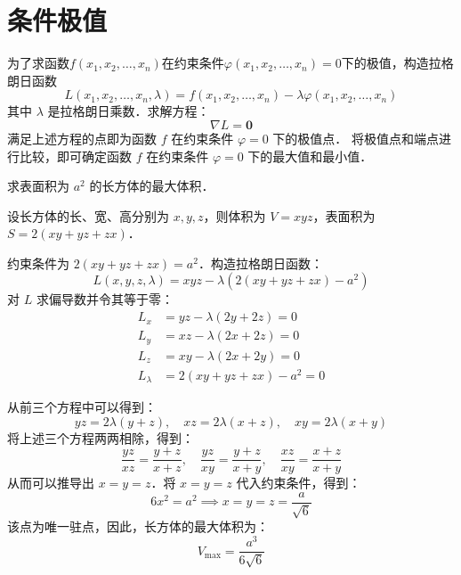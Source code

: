 \documentclass[12pt, a4paper, oneside, UTF8]{ctexbook}
\begin{document}
\section{条件极值}
\begin{theorem}[拉格朗日乘数法]
    为了求函数$f(x_1,x_2,\ldots,x_n)$在约束条件$\varphi(x_1,x_2,\ldots,x_n) = 0$下的极值，构造拉格朗日函数
    \[ L(x_1,x_2,\ldots,x_n,\lambda) = f(x_1,x_2,\ldots,x_n) - \lambda\varphi(x_1,x_2,\ldots,x_n) \]
    其中 $\lambda$ 是拉格朗日乘数．求解方程：
    \[ \nabla L = \mathbf{0} \]
    满足上述方程的点即为函数 $f$ 在约束条件 $\varphi = 0$ 下的极值点．
    将极值点和端点进行比较，即可确定函数 $f$ 在约束条件 $\varphi = 0$ 下的最大值和最小值．
\end{theorem}
\begin{example}
    求表面积为 $a^2$ 的长方体的最大体积．
\end{example}
\begin{solution}
    设长方体的长、宽、高分别为 $x, y, z$，则体积为 $V = xyz$，表面积为 $S = 2(xy + yz + zx)$．
    
    约束条件为 $2(xy + yz + zx) = a^2$．构造拉格朗日函数：
    \[ L(x,y,z,\lambda) = xyz - \lambda (2(xy + yz + zx) - a^2) \]
    对 $L$ 求偏导数并令其等于零：
    \begin{align*}
        L_x &= yz - \lambda (2y + 2z) = 0 \\
        L_y &= xz - \lambda (2x + 2z) = 0 \\
        L_z &= xy - \lambda (2x + 2y) = 0 \\
        L_\lambda &= 2(xy + yz + zx) - a^2 = 0
    \end{align*}
    
    从前三个方程中可以得到：
    \[ yz = 2\lambda(y+z), \quad xz = 2\lambda(x+z), \quad xy = 2\lambda(x+y) \]
    将上述三个方程两两相除，得到：
    \[ \frac{yz}{xz} = \frac{y+z}{x+z}, \quad \frac{yz}{xy} = \frac{y+z}{x+y}, \quad \frac{xz}{xy} = \frac{x+z}{x+y} \]
    从而可以推导出 $x=y=z$．将 $x=y=z$ 代入约束条件，得到：
    \[ 6x^2 = a^2 \implies x = y = z = \frac{a}{\sqrt{6}} \]
    该点为唯一驻点，因此，长方体的最大体积为：
    \[ \boxed{V_{\max} = \frac{a^3}{6\sqrt{6}}} \]
\end{solution}
\end{document}
